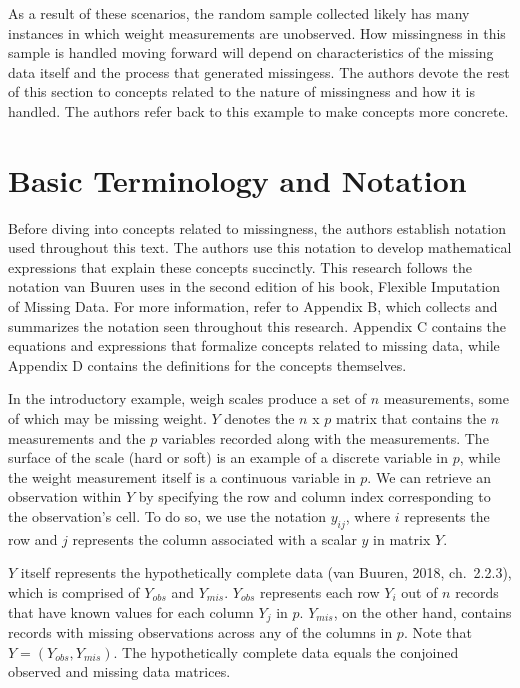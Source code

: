 \documentclass[12pt,oneside]{chicagocapstone}
\begin{document}
As a result of these scenarios, the random sample collected likely has
many instances in which weight measurements are unobserved. How
missingness in this sample is handled moving forward will depend on
characteristics of the missing data itself and the process that
generated missingess. The authors devote the rest of this section to
concepts related to the nature of missingness and how it is handled. The
authors refer back to this example to make concepts more concrete.

\section*{Basic Terminology and Notation}\label{background-basic-terms}

Before diving into concepts related to missingness, the authors
establish notation used throughout this text. The authors use this
notation to develop mathematical expressions that explain these concepts
succinctly. This research follows the notation van Buuren uses in the
second edition of his book, Flexible Imputation of Missing Data. For
more information, refer to Appendix B, which collects and summarizes the
notation seen throughout this research. Appendix C contains the
equations and expressions that formalize concepts related to missing
data, while Appendix D contains the definitions for the concepts
themselves.

In the introductory example, weigh scales produce a set of \(n\)
measurements, some of which may be missing weight. \(Y\) denotes the
\(n\) x \(p\) matrix that contains the \(n\) measurements and the \(p\)
variables recorded along with the measurements. The surface of the scale
(hard or soft) is an example of a discrete variable in \(p\), while the
weight measurement itself is a continuous variable in \(p\). We can
retrieve an observation within \(Y\) by specifying the row and column
index corresponding to the observation's cell. To do so, we use the
notation \(y_{ij}\), where \(i\) represents the row and \(j\) represents
the column associated with a scalar \(y\) in matrix \(Y\).

\(Y\) itself represents the hypothetically complete data (van Buuren,
2018, ch.~2.2.3), which is comprised of \(Y_{obs}\) and \(Y_{mis}\).
\(Y_{obs}\) represents each row \(Y_i\) out of \(n\) records that have
known values for each column \(Y_j\) in \(p\). \(Y_{mis}\), on the other
hand, contains records with missing observations across any of the
columns in \(p\). Note that \(Y = (Y_{obs}, Y_{mis})\). The
hypothetically complete data equals the conjoined observed and missing
data matrices.
\end{document}
